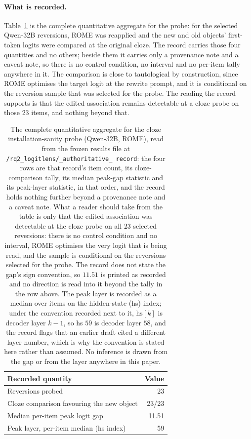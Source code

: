 \documentclass[letterpaper]{article}
\begin{document}
\paragraph{What is recorded.}
Table~\ref{tab:s7-record} is the complete quantitative aggregate for the probe:
for the selected Qwen-32B reversions, ROME was reapplied and the new and old
objects' first-token logits were compared at the original cloze.  The record
carries those four quantities and no others; beside them it carries only a
provenance note and a caveat note, so there is no control condition, no
interval and no per-item tally anywhere in it.  The comparison is close to
tautological by construction, since ROME optimises the target logit at the
rewrite prompt, and it is conditional on the reversion sample that was selected
for the probe.  The reading the record supports is that the edited association
remains detectable at a cloze probe on those \(23\) items, and nothing beyond
that.

\begin{table}[t]
\centering
\small
\begin{tabular}{@{}lr@{}}
\toprule
Recorded quantity & Value \\
\midrule
Reversions probed & 23 \\
Cloze comparison favouring the new object & 23/23 \\
Median per-item peak logit gap & 11.51 \\
Peak layer, per-item median (hs index) & 59 \\
\bottomrule
\end{tabular}
\caption{The complete quantitative aggregate for the cloze installation-sanity
probe (Qwen-32B, ROME), read from the frozen results file at
\texttt{/rq2\_\allowbreak logitlens/\allowbreak \_authoritative\_\allowbreak
record}: the four rows are that record's item count, its cloze-comparison
tally, its median peak-gap statistic and its peak-layer statistic, in that
order, and the record holds nothing further beyond a provenance note and a
caveat note.  What a reader should take from the table is only that the edited
association was detectable at the cloze probe on all \(23\) selected
reversions: there is no control condition and no interval, ROME optimises the
very logit that is being read, and the sample is conditional on the reversions
selected for the probe.  The record does not state the gap's sign convention,
so \(11.51\) is printed as recorded and no direction is read into it beyond the
tally in the row above.  The peak layer is recorded as a median over items on
the hidden-state (hs) index; under the convention recorded next to it,
\(\mathrm{hs}[k]\) is decoder layer \(k-1\), so hs \(59\) is decoder layer
\(58\), and the record flags that an earlier draft cited a different layer
number, which is why the convention is stated here rather than assumed.  No
inference is drawn from the gap or from the layer anywhere in this paper.}
\label{tab:s7-record}
\end{table}
\end{document}
